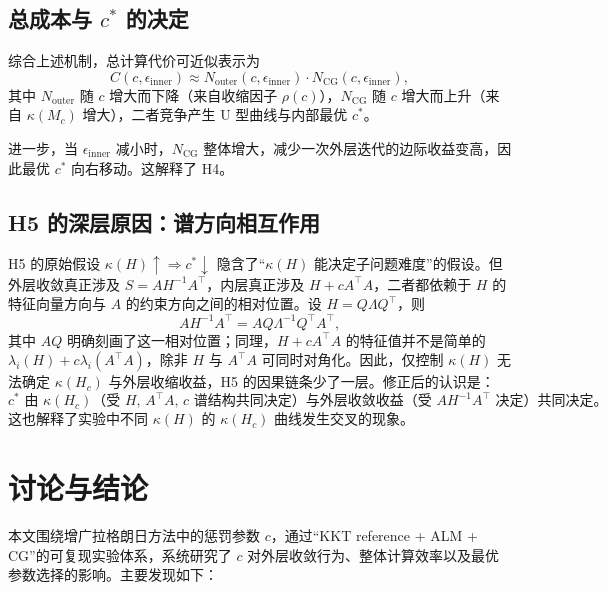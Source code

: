 \documentclass[UTF8]{ctexart}
\numberwithin{figure}{section}
\theoremstyle{definition}
\theoremstyle{examplestyle}
\theoremstyle{remark}
\begin{document}
\subsection{总成本与 $c^*$ 的决定}
\label{sec:mech-ustar}

综合上述机制，总计算代价可近似表示为
\begin{equation}
\label{eq:total-cost}
C(c,\epsilon_{\mathrm{inner}})\approx N_{\mathrm{outer}}(c,\epsilon_{\mathrm{inner}})\cdot N_{\mathrm{CG}}(c,\epsilon_{\mathrm{inner}}),
\end{equation}
其中 $N_{\mathrm{outer}}$ 随 $c$ 增大而下降（来自收缩因子 $\rho(c)$），$N_{\mathrm{CG}}$ 随 $c$ 增大而上升（来自 $\kappa(M_c)$ 增大），二者竞争产生 U 型曲线与内部最优 $c^*$。

进一步，当 $\epsilon_{\mathrm{inner}}$ 减小时，$N_{\mathrm{CG}}$ 整体增大，减少一次外层迭代的边际收益变高，因此最优 $c^*$ 向右移动。这解释了 H4。

\subsection{H5 的深层原因：谱方向相互作用}
\label{sec:mech-h5}

H5 的原始假设 $\kappa(H)\uparrow\Rightarrow c^*\downarrow$ 隐含了“$\kappa(H)$ 能决定子问题难度”的假设。但外层收敛真正涉及 $S=AH^{-1}A^\top$，内层真正涉及 $H+cA^\top A$，二者都依赖于 $H$ 的特征向量方向与 $A$ 的约束方向之间的相对位置。设 $H=Q\Lambda Q^\top$，则
\begin{equation}
AH^{-1}A^\top=AQ\Lambda^{-1}Q^\top A^\top,
\end{equation}
其中 $AQ$ 明确刻画了这一相对位置；同理，$H+cA^\top A$ 的特征值并不是简单的 $\lambda_i(H)+c\lambda_i(A^\top A)$，除非 $H$ 与 $A^\top A$ 可同时对角化。因此，仅控制 $\kappa(H)$ 无法确定 $\kappa(H_c)$ 与外层收缩收益，H5 的因果链条少了一层。修正后的认识是：
\[
c^* \text{ 由 } \kappa(H_c) \text{（受 } H,\,A^\top A,\,c \text{ 谱结构共同决定）与外层收敛收益（受 } AH^{-1}A^\top \text{ 决定）共同决定。}
\]
这也解释了实验中不同 $\kappa(H)$ 的 $\kappa(H_c)$ 曲线发生交叉的现象。

\section{讨论与结论}
\label{sec:discussion}

本文围绕增广拉格朗日方法中的惩罚参数 $c$，通过“KKT reference + ALM + CG”的可复现实验体系，系统研究了 $c$ 对外层收敛行为、整体计算效率以及最优参数选择的影响。主要发现如下：
\end{document}

